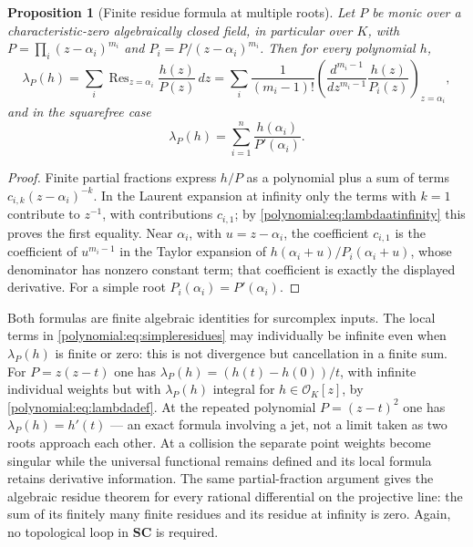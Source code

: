 \documentclass[11pt,letterpaper]{article}
\numberwithin{equation}{section}
\newtheorem{proposition}[theorem]{Proposition}
\theoremstyle{definition}
\theoremstyle{remark}\newtheorem{remark}[theorem]{Remark}
\newcommand{\SC}{\mathbf{SC}}
\newcommand{\OO}{\mathcal O}
\newcommand{\Res}{\operatorname{Res}}
\begin{document}
\begin{proposition}[Finite residue formula at multiple roots]
\label{polynomial:prop:localresidues}
Let $P$ be monic over a characteristic-zero algebraically closed field, in
particular over $K$, with $P=\prod_i(z-\alpha_i)^{m_i}$ and
$P_i=P/(z-\alpha_i)^{m_i}$. Then for every polynomial $h$,
\begin{equation}\label{polynomial:eq:localresidues}
 \lambda_P(h)=\sum_i\Res_{z=\alpha_i}\frac{h(z)}{P(z)}\,dz
 =\sum_i\frac1{(m_i-1)!}\left(\frac{d^{m_i-1}}{dz^{m_i-1}}
 \frac{h(z)}{P_i(z)}\right)_{z=\alpha_i} ,
\end{equation}
and in the squarefree case
\begin{equation}\label{polynomial:eq:simpleresidues}
 \lambda_P(h)=\sum_{i=1}^n\frac{h(\alpha_i)}{P'(\alpha_i)} .
\end{equation}
\end{proposition}
\begin{proof}
Finite partial fractions express $h/P$ as a polynomial plus a sum of terms
$c_{i,k}(z-\alpha_i)^{-k}$. In the Laurent expansion at infinity only the
terms with $k=1$ contribute to $z^{-1}$, with contributions $c_{i,1}$; by
\eqref{polynomial:eq:lambdaatinfinity} this proves the first equality. Near
$\alpha_i$, with $u=z-\alpha_i$, the coefficient $c_{i,1}$ is the coefficient
of $u^{m_i-1}$ in the Taylor expansion of $h(\alpha_i+u)/P_i(\alpha_i+u)$,
whose denominator has nonzero constant term; that coefficient is exactly the
displayed derivative. For a simple root $P_i(\alpha_i)=P'(\alpha_i)$.
\end{proof}

Both formulas are finite algebraic identities for surcomplex inputs. The local
terms in \eqref{polynomial:eq:simpleresidues} may individually be infinite
even when $\lambda_P(h)$ is finite or zero: this is not divergence but
cancellation in a finite sum. For $P=z(z-t)$ one has
$\lambda_P(h)=(h(t)-h(0))/t$, with infinite individual weights but with
$\lambda_P(h)$ integral for $h\in\OO_K[z]$, by
\eqref{polynomial:eq:lambdadef}. At the repeated polynomial $P=(z-t)^2$ one
has $\lambda_P(h)=h'(t)$ --- an exact formula involving a jet, not a limit
taken as two roots approach each other. At a collision the separate point
weights become singular while the universal functional remains defined and its
local formula retains derivative information. The same partial-fraction
argument gives the algebraic residue theorem for every rational differential
on the projective line: the sum of its finitely many finite residues and its
residue at infinity is zero. Again, no topological loop in $\SC$ is required.
\end{document}
